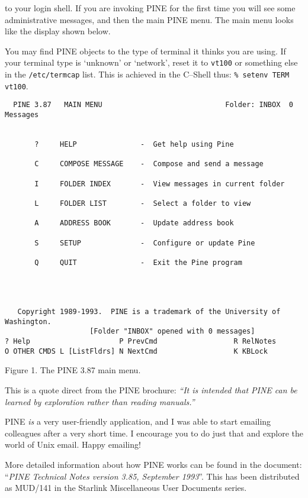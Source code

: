 to your login shell. If you are invoking PINE for the first time you
will see some administrative messages, and then the main PINE menu. The
main menu looks like the display shown below.

You may find PINE objects to the type of terminal it thinks you are
using. If your terminal type is `unknown' or `network', reset it to 
{\tt vt100} or something else in the {\tt /etc/termcap} list. This is
achieved in the C--Shell thus: {\tt \% setenv TERM vt100}.

\begin{small}
\begin{center}
\begin{verbatim}
  PINE 3.87   MAIN MENU                             Folder: INBOX  0 Messages


       ?     HELP               -  Get help using Pine

       C     COMPOSE MESSAGE    -  Compose and send a message

       I     FOLDER INDEX       -  View messages in current folder

       L     FOLDER LIST        -  Select a folder to view

       A     ADDRESS BOOK       -  Update address book

       S     SETUP              -  Configure or update Pine

       Q     QUIT               -  Exit the Pine program




   Copyright 1989-1993.  PINE is a trademark of the University of Washington.
                    [Folder "INBOX" opened with 0 messages]
? Help                     P PrevCmd                  R RelNotes
O OTHER CMDS L [ListFldrs] N NextCmd                  K KBLock
\end{verbatim}

Figure 1. The PINE 3.87 main menu.

\end{center}
\end{small}

This is a quote direct from the PINE brochure: {\em ``It is intended that
PINE can be learned by exploration rather than reading manuals.''}

PINE {\em is} a very user-friendly application, and I was able to start
emailing colleagues after a very short time. I encourage you to do just
that and explore the world of Unix email. Happy emailing!

More detailed information about how PINE works can be found in the
document: ``{\em PINE Technical Notes version 3.85, September 1993}\/''. This
has been distributed as MUD/141 in the Starlink Miscellaneous User
Documents series.



